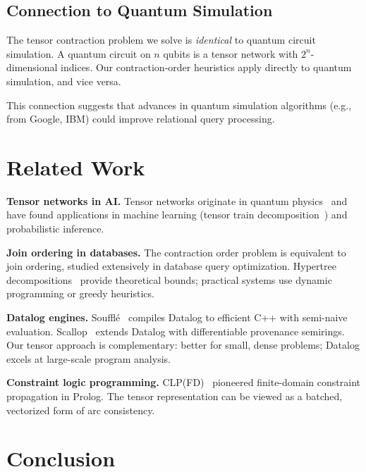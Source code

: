 \documentclass[11pt,a4paper]{article}
\begin{document}
\subsection{Connection to Quantum Simulation}

The tensor contraction problem we solve is \emph{identical} to quantum circuit simulation.
A quantum circuit on $n$ qubits is a tensor network with $2^n$-dimensional indices.
Our contraction-order heuristics apply directly to quantum simulation, and vice versa.

This connection suggests that advances in quantum simulation algorithms
(e.g., from Google, IBM) could improve relational query processing.

\section{Related Work}
\label{sec:related_chirho}

\textbf{Tensor networks in AI.}
Tensor networks originate in quantum physics~\cite{tensor_networks_intro_chirho} and
have found applications in machine learning (tensor train decomposition~\cite{tensor_train_chirho})
and probabilistic inference.

\textbf{Join ordering in databases.}
The contraction order problem is equivalent to join ordering, studied extensively
in database query optimization. Hypertree decompositions~\cite{gottlob_hypertree_chirho}
provide theoretical bounds; practical systems use dynamic programming or greedy heuristics.

\textbf{Datalog engines.}
Souffl\'e~\cite{souffle_chirho} compiles Datalog to efficient C++ with semi-naive evaluation.
Scallop~\cite{scallop_chirho} extends Datalog with differentiable provenance semirings.
Our tensor approach is complementary: better for small, dense problems; Datalog
excels at large-scale program analysis.

\textbf{Constraint logic programming.}
CLP(FD)~\cite{clpfd_chirho} pioneered finite-domain constraint propagation in Prolog.
The tensor representation can be viewed as a batched, vectorized form of arc consistency.

\section{Conclusion}
\label{sec:conclusion_chirho}
\end{document}
